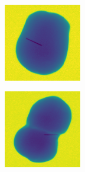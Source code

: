 \documentclass[11pt]{article}
\begin{document}
\begin{figure}[!h]
\begin{subfigure}[b]{0.22\textwidth}
         \caption{}
         \label{fig:metal_15}
     \end{subfigure}
          \\
    \begin{subfigure}[b]{0.22\textwidth}
         \centering
         \includegraphics[width=\textwidth]{figurer/potato_dataset/metal/metal_16.jpg}
         \caption{}
         \label{fig:metal_16}
     \end{subfigure}
     \hfill
     \begin{subfigure}[b]{0.22\textwidth}
         \centering
         \includegraphics[width=\textwidth]{figurer/potato_dataset/metal/metal_17.jpg}

\end{subfigure}
\end{figure}
\end{document}
